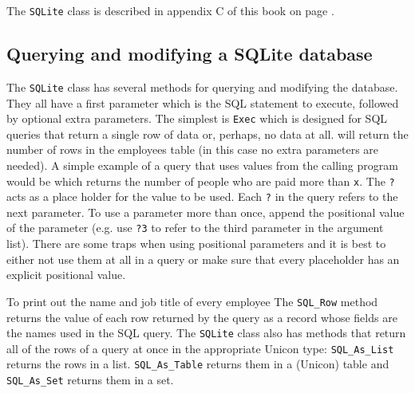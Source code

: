 The \texttt{SQLite} class is described in appendix C of this book on page
\pageref{SQLiteClass}.

\subsection*{Querying and modifying a SQLite database}

The \texttt{SQLite} class has several methods for querying and modifying
the database. They all have a first parameter which is the SQL statement
to execute, followed by optional extra parameters. The simplest is
\texttt{Exec} which is designed for SQL queries that return a single row
of data or, perhaps, no data at all.
\noindent
will return the number of rows in the employees table (in this case no
extra parameters are needed). A simple example of a query that uses values
from the calling program would be
\noindent
which returns the number of people who are paid more than \texttt{x}.
The \texttt{?} acts as a place holder for the value to be used.
Each \texttt{?} in the query refers to the next parameter. To use a
parameter more than once, append the positional value of the parameter
(e.g. use \texttt{?3} to refer to the third parameter in the argument
list).  There are some traps when using positional parameters and it is
best to either not use them at all in a query or make sure that every
placeholder has an explicit positional value.

To print out the name and job title of every employee
\noindent
The \texttt{SQL\_Row} method returns the value of each row returned by the
query as a record whose fields are the names used in the SQL query.
The \texttt{SQLite} class also has methods that return all of the rows of
a query at once in the appropriate Unicon type:
\texttt{SQL\_As\_List} returns the rows in a list.
\texttt{SQL\_As\_Table} returns them in a (Unicon) table and
\texttt{SQL\_As\_Set} returns them in a set.

